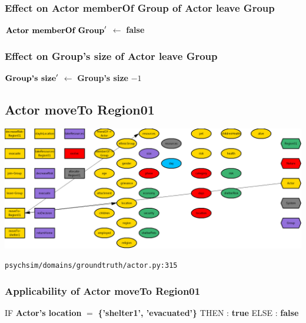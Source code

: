\documentclass{article}%
\begin{document}
%
\subsubsection{Effect on Actor memberOf Group of Actor leave Group}%
\label{ssubsec:Effect on Actor memberOf Group of Actor leave Group}%
\begin{flushleft}%
$\mbox{\textbf{Actor memberOf Group}} '$%
$\leftarrow$%
\textbf{false}%
\end{flushleft}

%
\subsubsection{Effect on Group's size of Actor leave Group}%
\label{ssubsec:Effect on Group's size of Actor leave Group}%
\begin{flushleft}%
$\mbox{\textbf{Group's size}} '$%
$\leftarrow$%
\textbf{Group's size}%
${-}1$%
\end{flushleft}

%
\subsection{Actor moveTo Region01}%
\label{subsec:Actor moveTo Region01}%
\includegraphics[width=\textwidth]{images/Actor-moveTo-Region01.png}%
\begin{flushleft}%
\verb|psychsim/domains/groundtruth/actor.py:315|%
\end{flushleft}%
\subsubsection{Applicability of Actor moveTo Region01}%
\label{ssubsec:Applicability of Actor moveTo Region01}%
\begin{flushleft}%
IF %
\textbf{Actor's location}%
$=$%
\textbf{\{'shelter1', 'evacuated'\}}%
\linebreak%
\hspace*{2em}%
THEN %
: %
\textbf{true}%
\linebreak%
\hspace*{2em}%
ELSE %
: %
\textbf{false}%
\end{flushleft}
\end{document}
